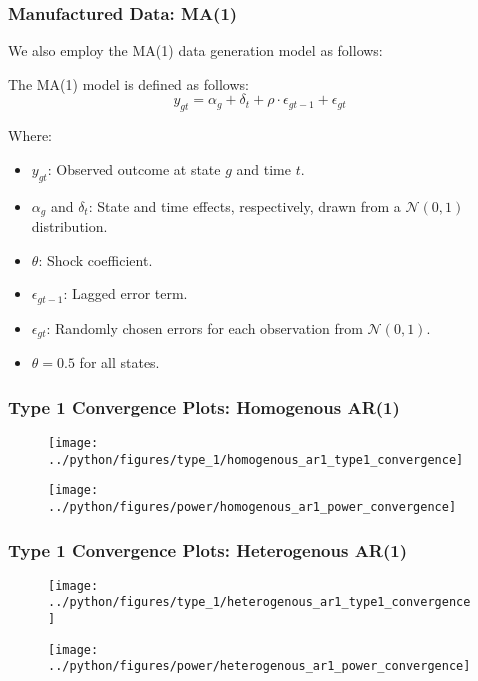 \documentclass[11pt, aspectratio=169]{beamer}
\begin{document}
\begin{frame}[t]
    \frametitle{Manufactured Data: MA(1)}

    We also employ the MA(1) data generation model as follows:

    The MA(1) model is defined as follows:
    \[
    y_{gt} = \alpha_g + \delta_t + \rho \cdot \epsilon_{gt-1} + \epsilon_{gt}
    \]
    
    Where:
    \begin{itemize}
        \item $y_{gt}$: Observed outcome at state $g$ and time $t$.
        \item $\alpha_g$ and $\delta_t$: State and time effects, respectively, drawn from a $\mathcal{N}(0,1)$ distribution.
        \item $\theta$: Shock coefficient.
        \item $\epsilon_{gt-1}$: Lagged error term.
        \item $\epsilon_{gt}$: Randomly chosen errors for each observation from $\mathcal{N}(0,1)$.
        \item $\theta = 0.5$ for all states.
    \end{itemize}
\end{frame}

\begin{frame}[t]
    \frametitle{Type 1 Convergence Plots: Homogenous AR(1)}

    \begin{figure}[H]
        \centering
        \texttt{[image: ../python/figures/type\_1/homogenous\_ar1\_type1\_convergence]}
    \end{figure}

    \begin{figure}[H]
        \centering
        \texttt{[image: ../python/figures/power/homogenous\_ar1\_power\_convergence]}
    \end{figure}

\end{frame}

\begin{frame}[t]
    \frametitle{Type 1 Convergence Plots: Heterogenous AR(1)}

    \begin{figure}[H]
        \centering
        \texttt{[image: ../python/figures/type\_1/heterogenous\_ar1\_type1\_convergence]}

    \end{figure}

    \begin{figure}[H]
        \centering
        \texttt{[image: ../python/figures/power/heterogenous\_ar1\_power\_convergence]}

    \end{figure}    

\end{frame}
\end{document}
